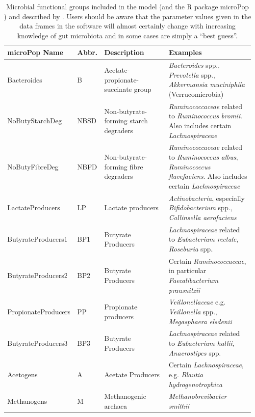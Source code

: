 \documentclass[a4paper]{article}
\begin{document}
\begin{table}[ht]
    \caption{Microbial functional groups included in the model (and the R package microPop \citep{Kettle2018}) and described by \cite{Kettle2015}. Users should be aware that the parameter values given in the data frames in the software will almost certainly change with increasing knowledge of gut microbiota and in some cases are simply a ``best guess''. }
    \small
    \centering
\begin{tabular}{|p{0.24\linewidth} | p{0.06\linewidth} | p{0.3\linewidth} | p{0.4\linewidth}|}
        \hline
microPop Name & Abbr. &	Description &	Examples\\
\hline
Bacteroides 	& B &Acetate-propionate-succinate group & 	\textit{Bacteroides} spp., \textit{Prevotella} spp.,  \textit{Akkermansia muciniphila} (Verrucomicrobia)\\
NoButyStarchDeg & NBSD &Non-butyrate-forming starch degraders & \textit{Ruminococcaceae} related to \textit{Ruminococcus bromii}. Also includes certain \textit{Lachnospiraceae}\\
NoButyFibreDeg & NBFD &	Non-butyrate-forming fibre degraders &	\textit{Ruminococcaceae} related to \textit{Ruminococcus albus}, \textit{Ruminococcus flavefaciens}. Also includes certain \textit{Lachnospiraceae}\\
LactateProducers & LP&	Lactate producers &	\textit{Actinobacteria}, especially \textit{Bifidobacterium} spp., \textit{Collinsella aerofaciens}\\
ButyrateProducers1  & BP1& 	Butyrate Producers &	\textit{Lachnospiraceae} related to \textit{Eubacterium rectale}, \textit{Roseburia} spp.\\
ButyrateProducers2 & BP2 &	Butyrate Producers &	Certain \textit{Ruminococcaceae}, in particular \textit{Faecalibacterium prausnitzii}\\
PropionateProducers & PP&	Propionate producers &	\textit{Veillonellaceae} e.g. \textit{Veillonella} spp., \textit{Megasphaera elsdenii}\\
ButyrateProducers3 & BP3&	Butyrate Producers & \textit{Lachnospiraceae} related to \textit{Eubacterium hallii}, \textit{Anaerostipes} spp.\\
Acetogens & A &	Acetate Producers &	Certain \textit{Lachnospiraceae}, e.g. \textit{Blautia hydrogenotrophica}\\
Methanogens & M&	Methanogenic archaea &	\textit{Methanobrevibacter smithii}\\
   \hline 
    \end{tabular}

    \label{table:groups}
\end{table}   
 
\end{document}
